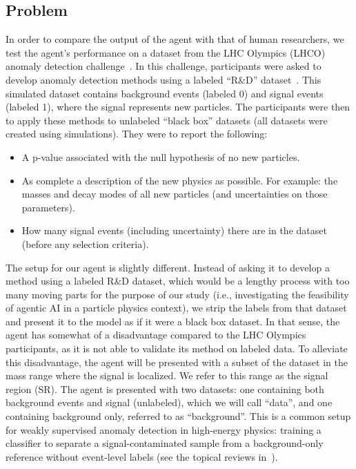 \documentclass[submission, Phys]{SciPost}
\begin{document}
\subsection{Problem}
\label{sec:problem}
In order to compare the output of the agent with that of human researchers, we test the agent’s performance on a dataset from the LHC Olympics (LHCO) anomaly detection challenge~\cite{Kasieczka:2021xcg}. In this challenge, participants were asked to develop anomaly detection methods using a labeled ``R\&D'' dataset~\cite{gregor_kasieczka_2019_6466204}. This simulated dataset contains background events (labeled 0) and signal events (labeled 1), where the signal represents new particles. The participants were then to apply these methods to unlabeled ``black box'' datasets (all datasets were created using simulations). They were to report the following:
\begin{itemize}
    \item A p-value associated with the null hypothesis of no new particles. 
    \item As complete a description of the new physics as possible. For example: the masses and decay modes of all new particles (and uncertainties on those parameters).
    \item How many signal events (including uncertainty) there are in the dataset (before any selection criteria).
\end{itemize}
The setup for our agent is slightly different. Instead of asking it to develop a method using a labeled R\&D dataset, which would be a lengthy process with too many moving parts for the purpose of our study (i.e., investigating the feasibility of agentic AI in a particle physics context), we strip the labels from that dataset and present it to the model as if it were a black box dataset. In that sense, the agent has somewhat of a disadvantage compared to the LHC Olympics participants, as it is not able to validate its method on labeled data. To alleviate this disadvantage, the agent will be presented with a subset of the dataset in the mass range where the signal is localized. We refer to this range as the signal region (SR). The agent is presented with two datasets: one containing both background events and signal (unlabeled), which we will call ``data'', and one containing background only, referred to as ``background''. 
This is a common setup for weakly supervised anomaly detection in high-energy physics: training a classifier to separate a signal-contaminated sample from a background-only reference without event-level labels (see the topical reviews in~\cite{Karagiorgi:2022qnh,Belis:2023mqs,hepmllivingreview}).
\end{document}
